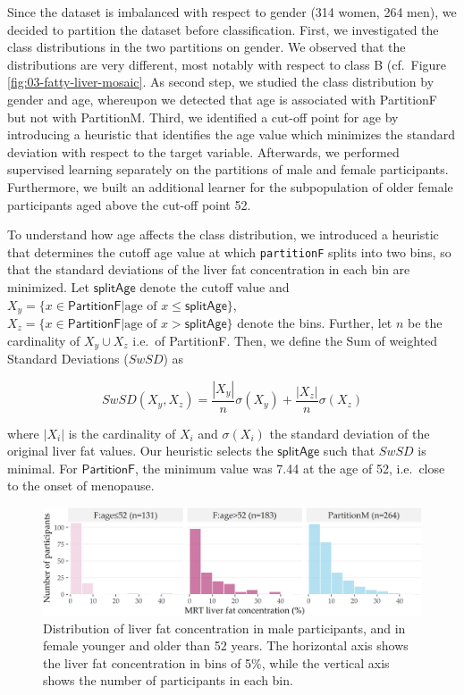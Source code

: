 \documentclass[
  oneside]{book}
\begin{document}
Since the dataset is imbalanced with respect to gender (314 women, 264 men), we decided to partition the dataset before classification.
First, we investigated the class distributions in the two partitions on gender.
We observed that the distributions are very different, most notably with respect to class B (cf.~Figure \ref{fig:03-fatty-liver-mosaic}.
As second step, we studied the class distribution by gender and age, whereupon we detected that age is associated with PartitionF but not with PartitionM.
Third, we identified a cut-off point for age by introducing a heuristic that identifies the age value which minimizes the standard deviation with respect to the target variable.
Afterwards, we performed supervised learning separately on the partitions of male and female participants.
Furthermore, we built an additional learner for the subpopulation of older female participants aged above the cut-off point 52.

To understand how age affects the class distribution, we introduced a heuristic that determines the cutoff age value at which \texttt{partitionF} splits into two bins, so that the standard deviations of the liver fat concentration in each bin are minimized.
Let \(\mathsf{splitAge}\) denote the cutoff value and \(X_y=\{x\in\mathsf{PartitionF}|\text{age of } x \leq \mathsf{splitAge}\}\), \(X_z=\{x\in\mathsf{PartitionF}|\text{age of } x > \mathsf{splitAge}\}\) denote the bins.
Further, let \(n\) be the cardinality of \(X_y\cup{}X_z\) i.e.~of PartitionF.
Then, we define the Sum of weighted Standard Deviations (\(SwSD\)) as

\begin{equation}
SwSD\left(X_y,X_z\right) = \frac{|X_y|}{n}\sigma({X_y})+\frac{|X_z|}{n}\sigma({X_z})
\label{eq:03-swsd}
\end{equation}

where \(|X_i|\) is the cardinality of \(X_i\) and \(\sigma(X_i)\) the standard deviation of the original liver fat values.
Our heuristic selects the \(\mathsf{splitAge}\) such that \(SwSD\) is minimal.
For \(\mathsf{PartitionF}\), the minimum value was 7.44 at the age of 52,
i.e.~close to the onset of menopause.



\begin{figure}

{\centering \includegraphics[width=0.75\linewidth]{figures/03-histogram-partitions-age-liverfat} 

}

\caption{Distribution of liver fat concentration in male participants, and in female younger and older than 52 years. The horizontal axis shows the liver fat concentration in bins of 5\%, while the vertical axis shows the number of participants in each bin.}\label{fig:03-histogram-partitions-age-liverfat}
\end{figure}
\end{document}
